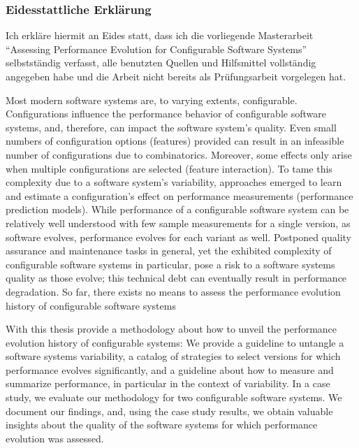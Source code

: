 \documentclass[
	12pt,
	a4paper,
	oneside,
	openright,
	listof=totoc%
]{scrbook}
\begin{document}

\newpage
\thispagestyle{empty}


 $$\qquad$$
 $$\qquad$$
 $$\qquad$$
 $$\qquad$$
 $$\qquad$$
 $$\qquad$$
 
\subsubsection*{Eidesstattliche Erklärung}
Ich erkläre hiermit an Eides statt, dass ich die vorliegende Masterarbeit
``Assessing Performance Evolution for Configurable Software Systems''
selbstständig verfasst, alle benutzten Quellen und Hilfsmittel vollständig
angegeben habe und die Arbeit nicht bereits als Prüfungsarbeit vorgelegen hat.

\vspace{1.3cm}



\clearpage
\setcounter{page}{1}
Most modern software systems are, to varying extents, configurable.
Configurations influence the performance behavior of configurable software
systems, and, therefore, can impact the software system’s quality. Even small
numbers of configuration options (features) provided can result in an
infeasible number of configurations due to combinatorics. Moreover, some
effects only arise when multiple configurations are selected (feature interaction).  To tame this complexity due
to a software system’s variability, approaches emerged to learn and estimate
a configuration’s effect on performance measurements (performance prediction
models). While performance of a configurable software system can be relatively
well understood with few sample measurements for a single version, as
software evolves, performance evolves for each variant as well. Postponed
quality assurance and maintenance tasks in general, yet the exhibited
complexity of configurable software systems in particular, pose a risk to a
software systems quality as those evolve; this technical debt can eventually
result in performance degradation. So far, there exists no means to assess the
performance evolution history of configurable software systems

With this thesis provide a methodology about how to unveil the performance
evolution history of configurable systems: We provide a  guideline to untangle
a software systems variability, a catalog of strategies to select versions for
which performance evolves significantly, and a guideline about how to measure
and summarize performance, in particular in the context of variability. In a
case study, we evaluate our methodology for two configurable software systems. We document our
findings, and, using the case study results, we obtain valuable insights
about the quality of the software systems for which performance evolution was
assessed.
\end{document}
